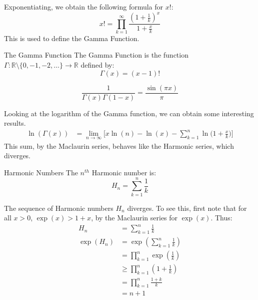         Exponentiating, we obtain the following formula for $x!$:
        \begin{equation}
            x!=\prod_{k=1}^{\infty}\frac{(1+\frac{1}{k})^{x}}{1+\frac{x}{k}}
        \end{equation}
        This is used to define the Gamma Function.
        \begin{ldefinition}{The Gamma Function}
            The Gamma Function is the function
            $\Gamma:\mathbb{R}\setminus\{0,\minus{1},\minus{2},\dots\}\rightarrow\mathbb{R}$
            defined by:
            \begin{equation}
                \Gamma(x)=(x-1)!
            \end{equation}
        \end{ldefinition}
        \begin{theorem}
            \begin{equation}
                \frac{1}{\Gamma(x)\Gamma(1-x)}=\frac{\sin(\pi{x})}{\pi}
            \end{equation}
        \end{theorem}
        Looking at the logarithm of the Gamma function, we can obtain some interesting
        results.
        \begin{align}
            \ln(\Gamma(x))&=
            \underset{n\rightarrow\infty}{\lim}\Big[
                x\ln(n)-\ln(x)-\sum_{k=1}^{n}\ln\big(1+\frac{x}{k}\big)\Big]
        \end{align}
        This sum, by the Maclaurin series, behaves like the Harmonic series, which
        diverges.
        \begin{ldefinition}{Harmonic Numbers}
            The $n^{th}$ Harmonic number is:
            \begin{equation}
                H_{n}=\sum_{k=1}^{n}\frac{1}{k}
            \end{equation}
        \end{ldefinition}
        The sequence of Harmonic numbers $H_{n}$ diverges. To see this, first note that
        for all $x>0$, $\exp(x)>1+x$, by the Maclaurin series for $\exp(x)$. Thus:
        \begin{align}
            H_{n}&=\sum_{k=1}^{n}\frac{1}{k}\\
            \exp(H_{n})&=\exp(\sum_{k=1}^{n}\frac{1}{k})\\
            &=\prod_{k=1}^{n}\exp(\frac{1}{k})\\
            &\geq\prod_{k=1}^{n}(1+\frac{1}{k})\\
            &=\prod_{k=1}^{n}\frac{1+k}{k}\\
            &=n+1
        \end{align}
